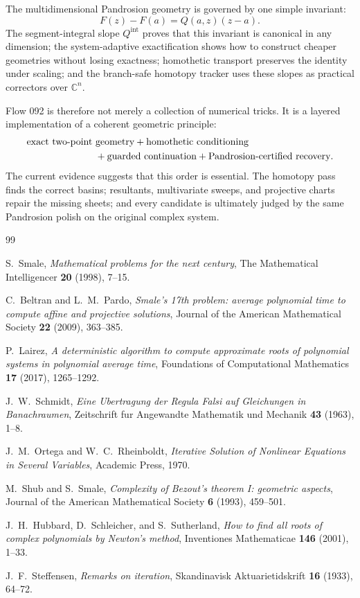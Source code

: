 \documentclass[11pt,a4paper]{article}
\theoremstyle{definition}
\theoremstyle{plain}
\theoremstyle{remark}
\newcommand{\C}{\mathbb C}
\begin{document}
The multidimensional Pandrosion geometry is governed by one simple invariant:
\[
  F(z)-F(a)=Q(a,z)(z-a).
\]
The segment-integral slope \(Q^{\mathrm{int}}\) proves that this invariant is
canonical in any dimension; the system-adaptive exactification shows how to
construct cheaper geometries without losing exactness; homothetic transport
preserves the identity under scaling; and the branch-safe homotopy tracker uses
these slopes as practical correctors over \(\C^n\).

Flow 092 is therefore not merely a collection of numerical tricks.  It is a
layered implementation of a coherent geometric principle:
\begin{align*}
  &\text{exact two-point geometry}
  +\text{homothetic conditioning} \\
  &\hspace{2.5cm}
  +\text{guarded continuation}
  +\text{Pandrosion-certified recovery}.
\end{align*}
The current evidence suggests that this order is essential.  The homotopy pass
finds the correct basins; resultants, multivariate sweeps, and projective charts
repair the missing sheets; and every candidate is ultimately judged by the same
Pandrosion polish on the original complex system.

\begin{thebibliography}{99}

S.~Smale,
\emph{Mathematical problems for the next century},
The Mathematical Intelligencer \textbf{20} (1998), 7--15.

C.~Beltran and L.~M.~Pardo,
\emph{Smale's 17th problem: average polynomial time to compute affine and projective solutions},
Journal of the American Mathematical Society \textbf{22} (2009), 363--385.

P.~Lairez,
\emph{A deterministic algorithm to compute approximate roots of polynomial systems in polynomial average time},
Foundations of Computational Mathematics \textbf{17} (2017), 1265--1292.

J.~W.~Schmidt,
\emph{Eine Ubertragung der Regula Falsi auf Gleichungen in Banachraumen},
Zeitschrift fur Angewandte Mathematik und Mechanik \textbf{43} (1963), 1--8.

J.~M.~Ortega and W.~C.~Rheinboldt,
\emph{Iterative Solution of Nonlinear Equations in Several Variables},
Academic Press, 1970.

M.~Shub and S.~Smale,
\emph{Complexity of Bezout's theorem I: geometric aspects},
Journal of the American Mathematical Society \textbf{6} (1993), 459--501.

J.~H.~Hubbard, D.~Schleicher, and S.~Sutherland,
\emph{How to find all roots of complex polynomials by Newton's method},
Inventiones Mathematicae \textbf{146} (2001), 1--33.

J.~F.~Steffensen,
\emph{Remarks on iteration},
Skandinavisk Aktuarietidskrift \textbf{16} (1933), 64--72.

\end{thebibliography}
\end{document}
